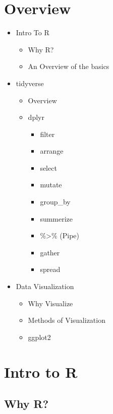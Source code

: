 
\section{Overview}
\begin{itemize}
    \item Intro To R
        \begin{itemize}
            \item Why R?
            \item An Overview of the basics
        \end{itemize}
    \item tidyverse
        \begin{itemize}
            \item Overview
            \item dplyr
                \begin{itemize}
                     \item filter
                     \item arrange
                     \item select
                     \item mutate
                     \item group\_by
                     \item summerize
                     \item \%\textgreater\% (Pipe)
                     \item gather
                     \item spread
            \end{itemize}
        \end{itemize}
    \item Data Visualization
        \begin{itemize}
            \item Why Visualize
            \item Methods of Visualization
            \item ggplot2
        \end{itemize}
\end{itemize}


\section{Intro to R}
\subsection{Why R?}

